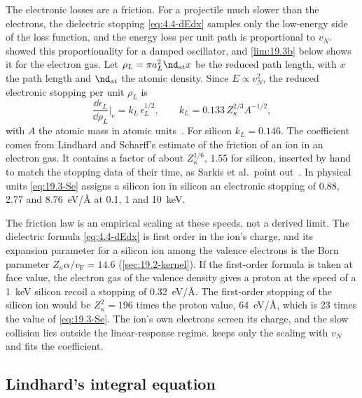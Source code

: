 The electronic losses are a friction. For a projectile much slower than the electrons, the dielectric stopping \cref{eq:4.4-dEdx} samples only the low-energy side of the loss function, and the energy loss per unit path is proportional to $v_N$.  showed this proportionality for a damped oscillator, and \cref{lim:19.3b} below shows it for the electron gas. Let $\rho_L = \pi a_L^2\nd_{\mathrm{at}}x$ be the reduced path length, with $x$ the path length and $\nd_{\mathrm{at}}$ the atomic density. Since $E \propto v_N^2$, the reduced electronic stopping per unit $\rho_L$ is
\begin{equation}
  \frac{\dd\epsilon_L}{\dd\rho_L}\bigg|_e = k_L\,\epsilon_L^{1/2} , \qquad k_L = 0.133\,Z_\kappa^{2/3}A^{-1/2} ,
  \label{eq:19.3-Se}
\end{equation}
with $A$ the atomic mass in atomic units~\cite[Eq.~(4)]{sarkis2020study}. For silicon $k_L = 0.146$. The coefficient comes from Lindhard and Scharff's estimate of the friction of an ion in an electron gas. It contains a factor of about $Z_\kappa^{1/6}$, 1.55 for silicon, inserted by hand to match the stopping data of their time, as Sarkis et al.\ point out~\cite[Sect.~``Scaling length'']{sarkis2023ionization}. In physical units \cref{eq:19.3-Se} assigns a silicon ion in silicon an electronic stopping of 0.88, 2.77 and \SI{8.76}{eV/\angstrom} at 0.1, 1 and \SI{10}{keV}.

The friction law is an empirical scaling at these speeds, not a derived limit. The dielectric formula \cref{eq:4.4-dEdx} is first order in the ion's charge, and its expansion parameter for a silicon ion among the valence electrons is the Born parameter $Z_\kappa\alpha/v_{\mathrm{F}} = 14.6$ (\cref{sec:19.2-kernel}). If the first-order formula is taken at face value, the electron gas of the valence density gives a proton at the speed of a \SI{1}{keV} silicon recoil a stopping of \SI{0.32}{eV/\angstrom}. The first-order stopping of the silicon ion would be $Z_\kappa^2 = 196$ times the proton value, \SI{64}{eV/\angstrom}, which is 23 times the value of \cref{eq:19.3-Se}. The ion's own electrons screen its charge, and the slow collision lies outside the linear-response regime.  keeps only the scaling with $v_N$ and fits the coefficient.

\subsection{Lindhard's integral equation}\label{sec:19.3-integral}

